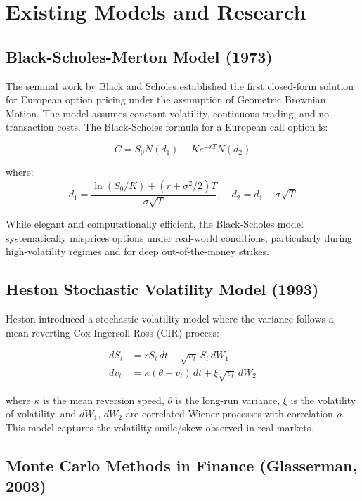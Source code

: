 \documentclass[12pt,a4paper]{report}
\begin{document}
\section{Existing Models and Research}

\subsection{Black-Scholes-Merton Model (1973)}

The seminal work by Black and Scholes \cite{black1973} established the first closed-form solution for European option pricing under the assumption of Geometric Brownian Motion. The model assumes constant volatility, continuous trading, and no transaction costs. The Black-Scholes formula for a European call option is:

\begin{equation}
    C = S_0 N(d_1) - K e^{-rT} N(d_2)
\end{equation}

where:
\begin{equation}
    d_1 = \frac{\ln(S_0/K) + (r + \sigma^2/2)T}{\sigma\sqrt{T}}, \quad d_2 = d_1 - \sigma\sqrt{T}
\end{equation}

While elegant and computationally efficient, the Black-Scholes model systematically misprices options under real-world conditions, particularly during high-volatility regimes and for deep out-of-the-money strikes.

\subsection{Heston Stochastic Volatility Model (1993)}

Heston \cite{heston1993} introduced a stochastic volatility model where the variance follows a mean-reverting Cox-Ingersoll-Ross (CIR) process:

\begin{align}
    dS_t &= rS_t\,dt + \sqrt{v_t}\,S_t\,dW_1 \\
    dv_t &= \kappa(\theta - v_t)\,dt + \xi\sqrt{v_t}\,dW_2
\end{align}

where $\kappa$ is the mean reversion speed, $\theta$ is the long-run variance, $\xi$ is the volatility of volatility, and $dW_1$, $dW_2$ are correlated Wiener processes with correlation $\rho$. This model captures the volatility smile/skew observed in real markets.

\subsection{Monte Carlo Methods in Finance (Glasserman, 2003)}
\end{document}
